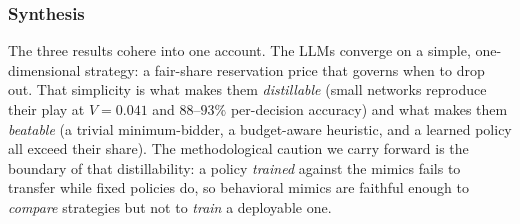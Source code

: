 \subsubsection{Synthesis}
The three results cohere into one account. The LLMs converge on a simple, one-dimensional strategy: a fair-share reservation price that governs when to drop out. That simplicity is what makes them \emph{distillable} (small networks reproduce their play at $V = 0.041$ and $88$--$93\%$ per-decision accuracy) and what makes them \emph{beatable} (a trivial minimum-bidder, a budget-aware heuristic, and a learned policy all exceed their share). The methodological caution we carry forward is the boundary of that distillability: a policy \emph{trained} against the mimics fails to transfer while fixed policies do, so behavioral mimics are faithful enough to \emph{compare} strategies but not to \emph{train} a deployable one.

